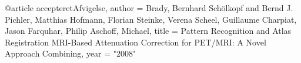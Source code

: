 @article{ accepteretAfvigelse,
       author = {Brady, Bernhard Schölkopf and Bernd J. Pichler, Matthias Hofmann, Florian Steinke, Verena Scheel, Guillaume Charpiat, Jason Farquhar, Philip Aschoff, Michael},
       title = {Pattern Recognition and Atlas Registration MRI-Based Attenuation Correction for PET/MRI: A Novel Approach Combining},
       year = "2008" }